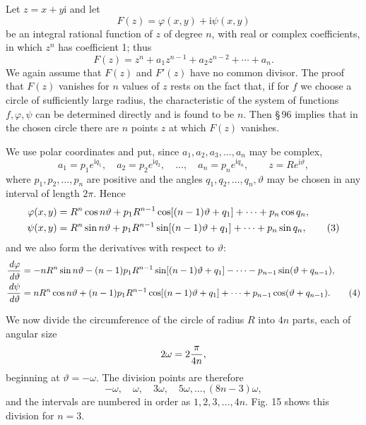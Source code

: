 \documentclass[11pt]{article}
\providecommand{\dd}{\,d}
\providecommand{\ii}{\mathrm{i}}
\begin{document}
Let $z=x+y\ii$ and let
\begin{equation}
        F(z)=\varphi(x,y)+\ii\psi(x,y)
\tag{1}
\end{equation}
be an integral rational function of $z$ of degree $n$, with real or complex coefficients, in which $z^n$ has coefficient 1; thus
\begin{equation}
        F(z)=z^n+a_1z^{n-1}+a_2z^{n-2}+\cdots+a_n.
\tag{2}
\end{equation}
We again assume that $F(z)$ and $F'(z)$ have no common divisor. The proof that $F(z)$ vanishes for $n$ values of $z$ rests on the fact that, if for $f$ we choose a circle of sufficiently large radius, the characteristic of the system of functions $f,\varphi,\psi$ can be determined directly and is found to be $n$. Then \S\,96 implies that in the chosen circle there are $n$ points $z$ at which $F(z)$ vanishes.

We use polar coordinates and put, since $a_1,a_2,a_3,\ldots,a_n$ may be complex,
\[
        a_1=p_1e^{\ii q_1},\quad a_2=p_2e^{\ii q_2},\quad\ldots,\quad a_n=p_ne^{\ii q_n},
        \qquad z=Re^{\ii\vartheta},
\]
where $p_1,p_2,\ldots,p_n$ are positive and the angles $q_1,q_2,\ldots,q_n,\vartheta$ may be chosen in any interval of length $2\pi$. Hence
\begin{align}
\varphi(x,y)&=R^n\cos n\vartheta+p_1R^{n-1}\cos[(n-1)\vartheta+q_1]+\cdots+p_n\cos q_n,\notag\\
\psi(x,y)&=R^n\sin n\vartheta+p_1R^{n-1}\sin[(n-1)\vartheta+q_1]+\cdots+p_n\sin q_n,
\tag{3}
\end{align}
and we also form the derivatives with respect to $\vartheta$:
\begin{align}
{\dd\varphi\over\dd\vartheta}
&=-nR^n\sin n\vartheta-(n-1)p_1R^{n-1}\sin[(n-1)\vartheta+q_1]
   -\cdots-p_{n-1}\sin(\vartheta+q_{n-1}),\notag\\
{\dd\psi\over\dd\vartheta}
&=nR^n\cos n\vartheta+(n-1)p_1R^{n-1}\cos[(n-1)\vartheta+q_1]
  +\cdots+p_{n-1}\cos(\vartheta+q_{n-1}).
\tag{4}
\end{align}

We now divide the circumference of the circle of radius $R$ into $4n$ parts, each of angular size
\[
        2\omega=2{\pi\over 4n},
\]
beginning at $\vartheta=-\omega$. The division points are therefore
\[
        -\omega,\quad \omega,\quad 3\omega,\quad 5\omega,\ldots,(8n-3)\omega,
\]
and the intervals are numbered in order as $1,2,3,\ldots,4n$. Fig. 15 shows this division for $n=3$.
\end{document}

